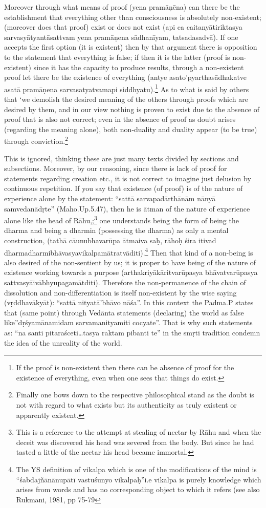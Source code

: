 Moreover through what means of proof (yena pramāṇēna) can there be the establishment that everything other than consciousness is absolutely non-existent; (moreover does that proof) exist or does not exist (api ca caitanyātiriktasya sarvasyātyantāsattvam yena pramāṇena sādhanīyam, tatsadasadvā). If one accepts the first option (it is existent) then by that argument there is opposition to the statement that everything is false; if then it is the latter (proof is non-existent) since it has the capacity to produce results, through a non-existent proof let there be the existence of everything (antye asato’pyarthasādhakatve asatā pramāṇena sarvasatyatvamapi siddhyatu).\footnote{If the proof is non-existent then there can be absence of proof for the existence of everything, even when one sees that things do exist.} As to what is said by others that ‘we demolish the desired meaning of the others through proofs which are desired by them, and in our view nothing is proven to exist due to the absence of proof that is also not correct; even in the absence of proof as doubt arises (regarding the meaning alone), both non-duality and duality appear (to be true) through conviction.\footnote{Finally one bows down to the respective philosophical stand as the doubt is not with regard to what exists but its authenticity as truly existent or apparently existent.} 

This is ignored, thinking these are just many texts divided by sections and subsections.  Moreover, by our reasoning, since there is lack of proof for statements regarding creation etc., it is not correct to imagine just delusion by continuous repetition. If you say that existence (of proof) is of the nature of experience alone by the statement: “sattā sarvapadārthānām nānyā samvedanādṛte” (Maho.Up.5.47), then he is ātman of the nature of experience alone like the head of Rāhu,;\footnote{This is a reference to the attempt at stealing of nectar by Rāhu and when the deceit was discovered his head was severed from the body. But since he had tasted a little of the nectar his head became immortal.} one understands being the form of being the dharma and being a dharmin (possessing the dharma) as only a mental construction, (tathā cāunubhavarūpa ātmaiva saḥ, rāhoḥ śira itivad dharmadharmibhāvasya\break vikalpamātratvāditi).\footnote{The YS definition of vikalpa which is one of the modifications of the mind is “śabdajñānānupātī vastuśunyo vikalpaḥ”i.e vikalpa is purely knowledge which arises from words and has no corresponding object to which it refers (see also Rukmani, 1981, pp 75-79} Then that kind of a non-being is also desired of the non-sentient by us; it is proper to have being of the nature of existence working towards a purpose (arthakriyākāritvarūpasya bhāvatvarūpasya sattvasyāivābhyupagamātditi). Therefore the non-perma\-nence of the chain of dissolution and non-differentiation is itself non-existent by the wise saying (vṛddhavākyāt): “sattā nityatā’bhāvo nāśa”. In this context the Padma.P states that (same point) through Vedānta statements (declaring) the world as false like”dṛśyamānamidam sarvamanityamiti cocyate”. That is why such statements as: “na santi pitaraśceti…tasya raktam pibanti te” in the smṛti tradition condemn the idea of the unreality of the world.

